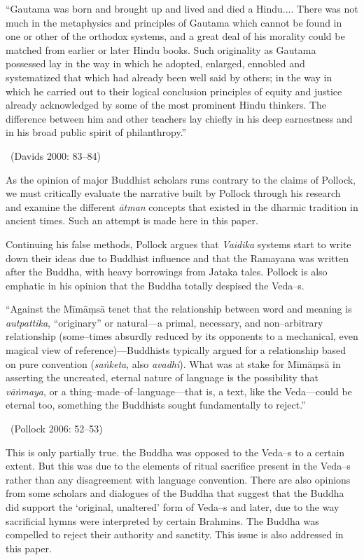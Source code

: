 \begin{myquote}
“Gautama was born and brought up and lived and died a Hindu.... There was not much in the metaphysics and principles of Gautama which cannot be found in one or other of the orthodox systems, and a great deal of his morality could be matched from earlier or later Hindu books. Such originality as Gautama possessed lay in the way in which he adopted, enlarged, ennobled and systematized that which had already been well said by others; in the way in which he carried out to their logical conclusion principles of equity and justice already acknowledged by some of the most prominent Hindu thinkers. The difference between him and other teachers lay chiefly in his deep earnestness and in his broad public spirit of philanthropy.” 

~\hfill (Davids 2000: 83–84)
\end{myquote}

As the opinion of major Buddhist scholars runs contrary to the claims of Pollock, we must critically evaluate the narrative built by Pollock through his research and examine the different \textit{ātman} concepts that existed in the dharmic tradition in ancient times. Such an attempt is made here in this paper.

Continuing his false methods, Pollock argues that \textit{Vaidika} systems start to write down their ideas due to Buddhist influence and that the Ramayana was written after the Buddha, with heavy borrowings from Jataka tales. Pollock is also emphatic in his opinion that the Buddha totally despised the Veda–s.

\begin{myquote}
“Against the Mīmāṃsā tenet that the relationship between word and meaning is \textit{autpattika}, “originary” or natural—a primal, necessary, and non–arbitrary relationship (some–times absurdly reduced by its opponents to a mechanical, even magical view of reference)—Buddhists typically argued for a relationship based on pure convention (\textit{saṅketa}, also \textit{avadhi}). What was at stake for Mīmāṃsā in asserting the uncreated, eternal nature of language is the possibility that \textit{vāṅmaya}, or a thing–made–of–language—that is, a text, like the Veda—could be eternal too, something the Buddhists sought fundamentally to reject.” 

~\hfill (Pollock 2006: 52–53)
\end{myquote}

This is only partially true. the Buddha was opposed to the Veda–s to a certain extent. But this was due to the elements of ritual sacrifice present in the Veda–s rather than any disagreement with language convention. There are also opinions from some scholars and dialogues of the Buddha that suggest that the Buddha did support the ‘original, unaltered’ form of Veda–s and later, due to the way sacrificial hymns were interpreted by certain Brahmins. The Buddha was compelled to reject their authority and sanctity. This issue is also addressed in this paper.


